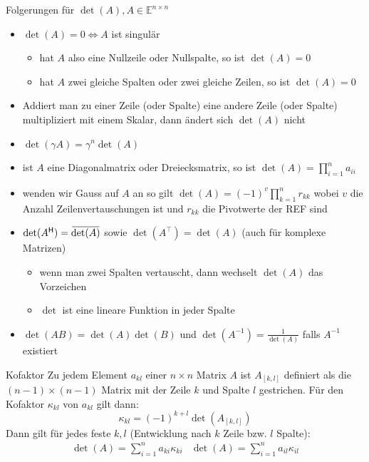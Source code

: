 \documentclass[a4paper,10pt]{article}
\newcommand*{\hermconj}{\mathsf{H}}
\def\E{\mathbb{E}}
\newcommand{\overbar}[1]{\mkern 1.5mu\overline{\mkern-1.5mu#1\mkern-1.5mu}\mkern 1.5mu}
\begin{document}
\begin{subbox}{Folgerungen für $\det(A), A \in \E^{n \times n}$}
  \begin{itemize}
    \item {
      $\det(A) = 0 \iff A$ ist singulär
      \begin{itemize}
        \item hat $A$ also eine Nullzeile oder Nullspalte, so ist $\det(A) = 0$
        \item hat $A$ zwei gleiche Spalten oder zwei gleiche Zeilen, so ist $\det(A) = 0$
      \end{itemize}
    }
    \item Addiert man zu einer Zeile (oder Spalte) eine andere Zeile (oder Spalte) multipliziert mit einem Skalar, dann ändert sich $\det(A)$ nicht
    \item $\det(\gamma A) = \gamma^n \det(A)$
    \item ist $A$ eine Diagonalmatrix oder Dreiecksmatrix, so ist $\det(A) = \prod_{i=1}^n a_{ii}$
    \item wenden wir Gauss auf $A$ an so gilt $\det(A) = (-1)^v \prod_{k=1}^n r_{kk}$ wobei $v$ die Anzahl Zeilenvertauschungen ist und $r_{kk}$ die Pivotwerte der REF sind
    \item{
      $\det(A^\hermconj) = \overbar{\det(A)}$ sowie $\det(A^\top) = \det(A)$ (auch für komplexe Matrizen)
      \begin{itemize}
        \item wenn man zwei Spalten vertauscht, dann wechselt $\det(A)$ das Vorzeichen
        \item $\det$ ist eine lineare Funktion in jeder Spalte
      \end{itemize}
    }
    \item $\det(AB) = \det(A) \det(B)$ und $\det(A^{-1}) = \frac{1}{\det(A)}$ falls $A^{-1}$ existiert
  \end{itemize}
\end{subbox}

\begin{subbox}{Kofaktor }
  Zu jedem Element $a_{kl}$ einer $n \times n$ Matrix $A$ ist $A_{[k,l]}$ definiert als die $(n-1) \times (n-1)$ Matrix mit der Zeile $k$ und Spalte $l$ gestrichen. Für den Kofaktor $\kappa_{kl}$ von $a_{kl}$ gilt dann:
  $$\kappa_{kl} = (-1)^{k+l} \det(A_{[k,l]})$$
  Dann gilt für jedes feste $k, l$ (Entwicklung nach $k$ Zeile bzw. $l$ Spalte):
  \begin{align*}
    & \det(A) = \sum_{i=1}^n a_{ki} \kappa_{ki} & \det(A) = \sum_{i=1}^n a_{il} \kappa_{il} &
  \end{align*}
\end{subbox}
\end{document}
